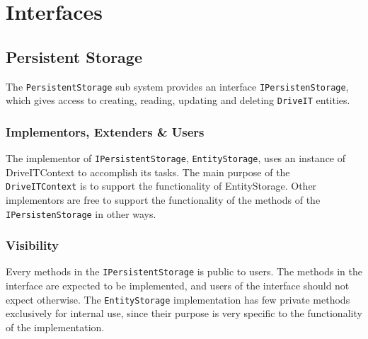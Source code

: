 \section{Interfaces}

\subsection{Persistent Storage}
The \texttt{PersistentStorage} sub system provides an interface \texttt{IPersistenStorage}, which gives access to creating, reading, updating and deleting \texttt{DriveIT} entities. 

\subsubsection{Implementors, Extenders \& Users}
The implementor of \texttt{IPersistentStorage}, \texttt{EntityStorage}, uses an instance of DriveITContext to accomplish its tasks. The main purpose of the \texttt{DriveITContext} is to support the functionality of EntityStorage. Other implementors are free to support the functionality of the methods of the \texttt{IPersistenStorage} in other ways. 

\subsubsection{Visibility}
Every methods in the \texttt{IPersistentStorage} is public to users. The methods in the interface are expected to be implemented, and users of the interface should not expect otherwise.
The \texttt{EntityStorage} implementation has few private methods exclusively for internal use, since their purpose is very specific to the functionality of the implementation.
